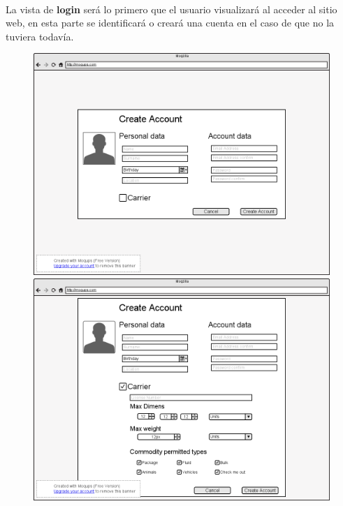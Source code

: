 \documentclass[10pt, a4paper,spanish]{article}
\begin{document}
		\paragraph{}
		La vista de \textbf{login} será lo primero que el usuario visualizará al acceder al sitio web, en esta parte se identificará o creará una cuenta en el caso de que no la tuviera todavía.


		\begin{figure}[H]
			\centering
			\begin{minipage}[b]{0.49\textwidth}
				\includegraphics[width=\textwidth]{res/CrearCuenta.png}
			\end{minipage}
			\begin{minipage}[b]{0.49\textwidth}
				\includegraphics[width=\textwidth]{res/CrearCuentaTransportista.png}
			\end{minipage}
		\end{figure}
\end{document}
